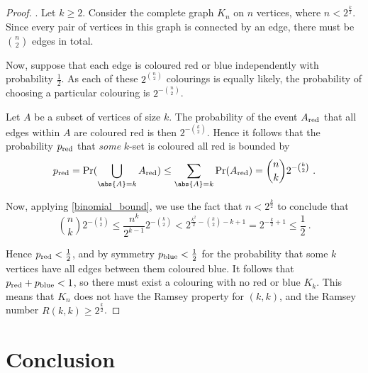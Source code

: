 \documentclass{article}
\begin{document}
\begin{proof}\citep{aigner2010proofs}.
    Let $k \geq 2$. Consider the complete graph $K_n$ on $n$ vertices, where $n < 2^{\frac k 2}$. Since every pair of vertices in this graph is connected by an edge, there must be $n \choose 2$ edges in total.

    Now, suppose that each edge is coloured red or blue independently with probability $\frac 1 2$. As each of these $2^{n \choose 2}$ colourings is equally likely, the probability of choosing a particular colouring is $2^{-{n \choose 2}}$.

    Let $A$ be a subset of vertices of size $k$. The probability of the event $A_{\mathrm{red}}$ that all edges within $A$ are coloured red is then $2^{-{k \choose 2}}$. Hence it follows that the probability $p_{\mathrm{red}}$ that \emph{some} $k$-set is coloured all red is bounded by
    \[
        p_\red = \Pr(\bigcup_{\abs{A} = k} A_\red)
        \leq \sum_{\abs{A} = k} \Pr(A_\red)
        = {n \choose k} 2^{-{k \choose 2}} \ .
    \]

Now, applying \cref{binomial_bound}, we use the fact that $n < 2^{\frac k 2}$ to conclude that
    \[
        {n \choose k} 2^{-{k \choose 2}}
        \leq \frac{n^k}{2^{k-1}} 2^{-{k \choose 2}}
        < 2^{\frac{k^2}{2} - {k \choose 2} - k + 1}
        = 2^{-\frac k 2 + 1}
        \leq \frac 1 2 \ .
    \]

Hence $p_{\mathrm{red}} < \frac 1 2$, and by symmetry $p_{\mathrm{blue}} < \frac 1 2$ for the probability that some $k$ vertices have all edges between them coloured blue. It follows that $p_{\mathrm{red}} + p_{\mathrm{blue}} < 1$, so there must exist a colouring with no red or blue $K_k$. This means that $K_n$ does not have the Ramsey property for $(k, k)$, and the Ramsey number $R(k,k) \geq 2^{\frac k 2}$.
\end{proof}

\section{Conclusion}


\listoftodos



\end{document}

